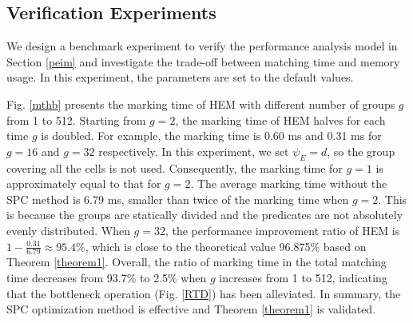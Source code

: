 \documentclass[runningheads]{llncs}
\begin{document}
\subsection{Verification Experiments}
We design a benchmark experiment to verify the performance analysis model in Section \ref{peim} and investigate the trade-off between matching time and memory usage. In this experiment, the parameters are set to the default values.

Fig. \ref{mthb} presents the marking time of HEM with different number of groups $g$ from 1 to 512. Starting from $g=2$, the marking time of HEM halves for each time $g$ is doubled. For example, the marking time is 0.60 ms and 0.31 ms for $g=16$ and $g=32$ respectively. 
In this experiment, we set $\psi_E=d$, so the group covering all the cells is not used. Consequently, the marking time for $g=1$ is approximately equal to that for $g=2$. The average marking time without the SPC method is 6.79 ms, smaller than twice of the marking time when $g=2$. This is because the groups are statically divided and the predicates are not absolutely evenly distributed. 
When $g=32$, the performance improvement ratio of HEM is $1 - \frac{0.31}{6.79}\approx95.4\%$, which is close to the theoretical value 96.875\% based on Theorem \ref{theorem1}. 
Overall, the ratio of marking time in the total matching time decreases from 93.7\% to 2.5\% when $g$ increases from 1 to 512, indicating that the bottleneck operation (Fig. \ref{RTD}) has been alleviated. In summary, the SPC optimization method is effective and Theorem \ref{theorem1} is validated. 


\end{document}
